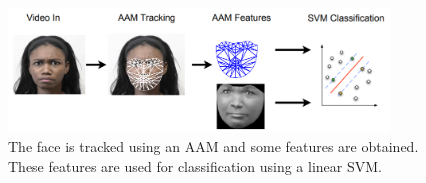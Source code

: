 \begin{figure}[!htb]	\includegraphics[width=0.9\textwidth]{images/aam.png} 
    \centering

\caption{
The face is tracked using an AAM and some features are obtained. These features are used for classification using a linear SVM.
} 

\label{fig:aam}
\end{figure}